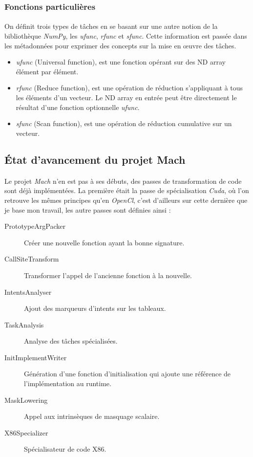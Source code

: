 \subsubsection{Fonctions particulières\label{particular_function}}
\paragraph{}
On définit trois types de tâches en se basant sur une autre notion de la
bibliothèque \emph{NumPy}, les \emph{ufunc}, \emph{rfunc} et \emph{sfunc}. Cette
information est passée dans les métadonnées pour exprimer des concepts sur la
mise en \oe{}uvre des tâches.

\begin{itemize}
\item \emph{ufunc} (Universal function), est une fonction opérant sur des ND
   array élément par élément.

\item \emph{rfunc} (Reduce function), est une opération de réduction
   s'appliquant à tous les éléments d'un vecteur. Le ND array en entrée peut
      être directement le résultat d'une fonction optionnelle \emph{ufunc}.

\item \emph{sfunc} (Scan function), est une opération de réduction cumulative
   sur un vecteur.
\end{itemize}

\subsection{État d'avancement du projet Mach}
\paragraph{}
Le projet \emph{Mach} n'en est pas à ses débuts, des passes de transformation de
code sont déjà implémentées. La première était la passe de spécialisation
\emph{Cuda}, où l'on retrouve les mêmes principes qu'en \emph{OpenCl}, c'est
d'ailleurs sur cette dernière que je base mon travail, les autre passes sont
définies ainsi :

\begin{description}
\item[PrototypeArgPacker] Créer une nouvelle fonction ayant la bonne signature.
\item[CallSiteTransform] Transformer l'appel de l’ancienne fonction à la nouvelle.
\item[IntentsAnalyser] Ajout des marqueurs d'intents sur les tableaux.
\item[TaskAnalysis] Analyse des tâches spécialisées.
\item[InitImplementWriter] Génération d'une fonction d'initialisation qui ajoute
   une référence de l'implémentation au runtime.
\item[MaskLowering] Appel aux intrinsèques de masquage scalaire.
\item[X86Specializer] Spécialisateur de code X86.
\end{description}

